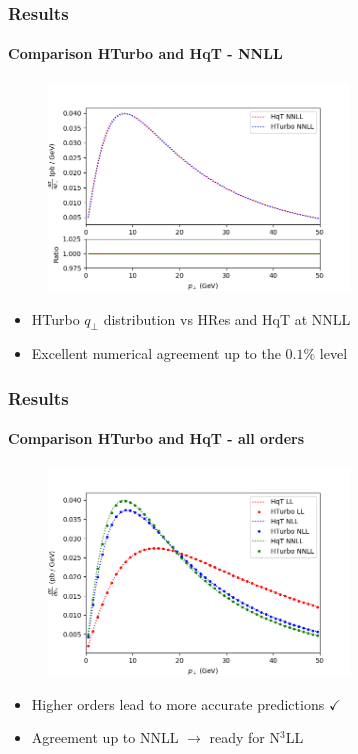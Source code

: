 \documentclass[aspectratio=43]{beamer}
\begin{document}
\begin{frame}

	\frametitle{Results}
	\framesubtitle{Comparison HTurbo and HqT - NNLL}
	
	\begin{figure}
		\includegraphics[width = 8cm]{plots/hturbo_NNLL_f2only2.png}
	\end{figure}
	
	\begin{itemize}
		\item HTurbo $q_{\perp}$ distribution vs HRes and HqT at NNLL
		\item Excellent numerical agreement up to the $0.1\%$ level
\end{itemize}

\end{frame}

\begin{frame}
	
	\frametitle{Results}
	\framesubtitle{Comparison HTurbo and HqT - all orders}
	
	\begin{figure}
		\includegraphics[width = 8cm]{plots/hturbo_all_noevol.png}
	\end{figure}
	
	\begin{itemize}
		\item Higher orders lead to more accurate predictions {\color{darkgreen}$\checkmark$} 
		\item Agreement up to NNLL $\longrightarrow$ {\color{blue}ready for N$^{3}$LL}
	\end{itemize}

\end{frame}
\end{document}
